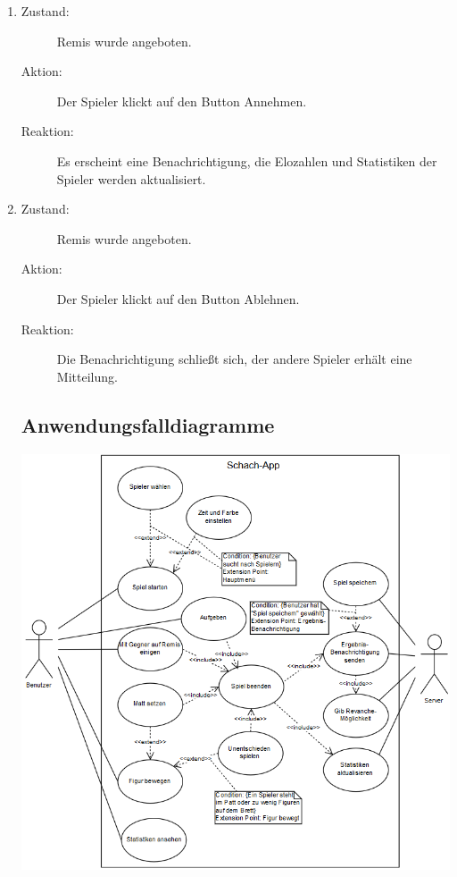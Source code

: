 \documentclass[parskip=full]{scrartcl}
\begin{document}
\begin{enumerate}
	\item
	\begin{description}
	\item[Zustand:] Remis wurde angeboten.
	\item[Aktion:] Der Spieler klickt auf den Button \glqq Annehmen\grqq.
	\item[Reaktion:] Es erscheint eine Benachrichtigung, die Elozahlen und Statistiken der Spieler werden aktualisiert.  \\
	\end{description}
	
	\item
	\begin{description}
	\item[Zustand:] Remis wurde angeboten.
	\item[Aktion:] Der Spieler klickt auf den Button \glqq Ablehnen\grqq.
	\item[Reaktion:] Die Benachrichtigung schließt sich, der andere Spieler erhält eine Mitteilung.  \\
	\end{description}



\subsection{Anwendungsfalldiagramme} 
		\begin{minipage}{\linewidth}
			\centering
			\includegraphics[width=1\linewidth]{Anwendung}
			\label{fig:Schach-App}
		\end{minipage}
\end{enumerate}
\pagebreak
\glsaddall 
\printglossaries
\end{document}
